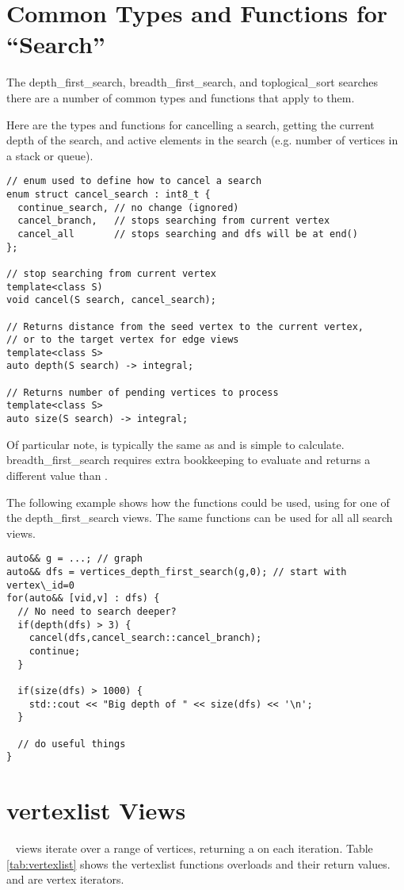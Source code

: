\section{Common Types and Functions for ``Search'' }
The depth\_first\_search, breadth\_first\_search, and toplogical\_sort searches there are a number of common types and functions that apply to them. 

Here are the types and functions for cancelling a search, getting the current depth of the search, and active elements in the search (e.g. number of vertices in a stack or queue).
\begin{lstlisting}
// enum used to define how to cancel a search
enum struct cancel_search : int8_t { 
  continue_search, // no change (ignored)
  cancel_branch,   // stops searching from current vertex
  cancel_all       // stops searching and dfs will be at end()
};

// stop searching from current vertex
template<class S)
void cancel(S search, cancel_search);

// Returns distance from the seed vertex to the current vertex, 
// or to the target vertex for edge views
template<class S>
auto depth(S search) -> integral;

// Returns number of pending vertices to process
template<class S>
auto size(S search) -> integral; 
\end{lstlisting}

Of particular note,  is typically the same as  and is simple to calculate. breadth\_first\_search requires extra bookkeeping to evaluate  and returns a different value than .

The following example shows how the functions  could be used, using  for one of the depth\_first\_search views. The same functions can be used for all all search views.
\begin{lstlisting}
auto&& g = ...; // graph
auto&& dfs = vertices_depth_first_search(g,0); // start with vertex\_id=0
for(auto&& [vid,v] : dfs) {
  // No need to search deeper?
  if(depth(dfs) > 3) {
    cancel(dfs,cancel_search::cancel_branch);
    continue;
  }
  
  if(size(dfs) > 1000) {
    std::cout << "Big depth of " << size(dfs) << '\n';
  }
  
  // do useful things
}

\end{lstlisting}

\section{vertexlist Views}
\
 views iterate over a range of vertices, returning a  on each iteration. 
Table \ref{tab:vertexlist} shows the vertexlist functions overloads and their return values. \tcode{first} and  are vertex iterators.

